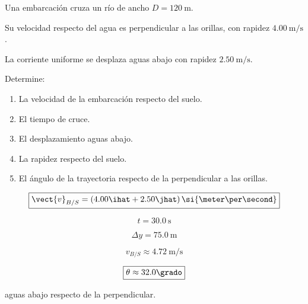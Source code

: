 \begin{ejercicio}
Una embarcación cruza un río de ancho
\(D=\SI{120}{\meter}\).

Su velocidad respecto del agua es perpendicular
a las orillas, con rapidez
\(\SI{4.00}{\meter\per\second}\).

La corriente uniforme se desplaza aguas abajo
con rapidez \(\SI{2.50}{\meter\per\second}\).

Determine:

\begin{enumerate}[label=\alph*)]
    \item La velocidad de la embarcación respecto del suelo.
    \item El tiempo de cruce.
    \item El desplazamiento aguas abajo.
    \item La rapidez respecto del suelo.
    \item El ángulo de la trayectoria respecto de
    la perpendicular a las orillas.
\end{enumerate}
\end{ejercicio}

\begin{respuesta}
\[
\boxed{
\vect{v}_{B/S}
=
(4.00\ihat+2.50\jhat)\,
\si{\meter\per\second}
}
\]

\[
\boxed{
t=\SI{30.0}{\second}
}
\]

\[
\boxed{
\Delta y=\SI{75.0}{\meter}
}
\]

\[
\boxed{
v_{B/S}\approx
\SI{4.72}{\meter\per\second}
}
\]

\[
\boxed{
\theta\approx32.0\grado
}
\]

aguas abajo respecto de la perpendicular.
\end{respuesta}

